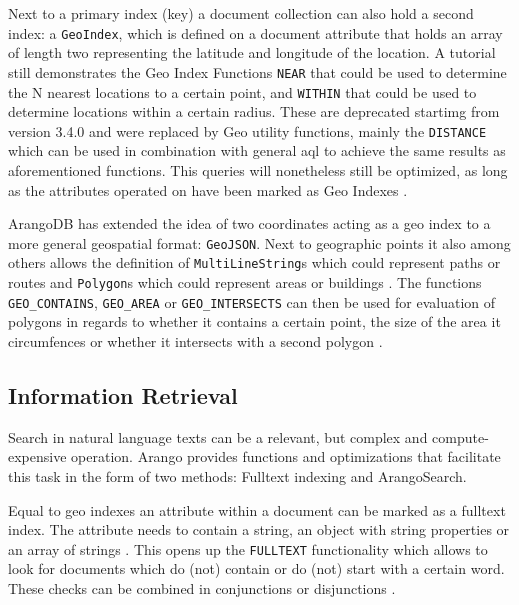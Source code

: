 Next to a primary index (key) a document collection can also hold a second index: a \texttt{GeoIndex}, which is defined on a document attribute that holds an array of length two representing the latitude and longitude of the location. A tutorial \parencite{GeoTut} still demonstrates the Geo Index Functions \texttt{NEAR} that could be used to determine the N nearest locations to a certain point, and \texttt{WITHIN} that could be used to determine locations within a certain radius.
These are deprecated startimg from version 3.4.0 and were replaced by Geo utility functions, mainly the \texttt{DISTANCE} which can be used in combination with general \gls{aql} to achieve the same results as aforementioned functions. This queries will nonetheless still be optimized, as long as the attributes operated on have been marked as Geo Indexes \parencite{GeoFunc}.

ArangoDB has extended the idea of two coordinates acting as a geo index to a more general geospatial format: \texttt{GeoJSON}. Next to geographic points it also among others allows the definition of \texttt{MultiLineString}s which could represent paths or routes and \texttt{Polygon}s which could represent areas or buildings \parencite{GeoJSON}.
The functions \texttt{GEO\_CONTAINS}, \texttt{GEO\_AREA} or \texttt{GEO\_INTERSECTS} can then be used for evaluation of polygons in regards to whether it contains a certain point, the size of the area it circumfences or whether it intersects with a second polygon \parencite{GeoFunc}.

\subsection{Information Retrieval}

Search in natural language texts can be a relevant, but complex and compute-expensive operation. Arango provides functions and optimizations that facilitate this task in the form of two methods: Fulltext indexing and ArangoSearch.

Equal to geo indexes an attribute within a document can be marked as a fulltext index. The attribute needs to contain a string, an object with string properties or an array of strings \parencite{FulltextIndex}. This opens up the \texttt{FULLTEXT} functionality which allows to look for documents which do (not) contain or do (not) start with a certain word. These checks can be combined in conjunctions or disjunctions \parencite{FulltextFunc}.

